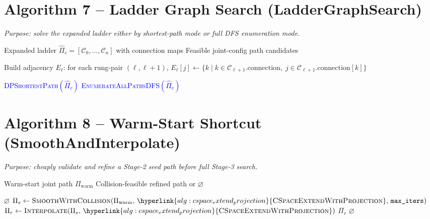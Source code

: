 \documentclass[11pt]{article}
\newcommand{\chg}[1]{\textcolor{blue}{#1}}
\newcommand{\AlgTarget}[1]{\hypertarget{#1}{}}
\newcommand{\AlgLink}[2]{\hyperlink{#1}{#2}}
\begin{document}
\section*{Algorithm 7 -- Ladder Graph Search (LadderGraphSearch)}
\noindent\textit{Purpose: solve the expanded ladder either by shortest-path mode or full DFS enumeration mode.}
\AlgTarget{alg:ladder_graph_search}
\begin{algorithm}[H]
\caption{\textsc{LadderGraphSearch}($\hat{\Pi}_c,\,\texttt{mode}$)}
\begin{algorithmic}[1]
\Require Expanded ladder $\hat{\Pi}_c = [\mathcal{C}_0, \ldots, \mathcal{C}_n]$ with connection maps
\Ensure  Feasible joint-config path candidates

\State Build adjacency $E_\ell$: for each rung-pair $(\ell, \ell{+}1)$,
       $E_\ell[j] \gets \{k \mid k \in \mathcal{C}_{\ell+1}.\text{connection},\; j \in \mathcal{C}_{\ell+1}.\text{connection}[k]\}$

\If{\chg{$\texttt{mode}=\texttt{shortest}$}}
  \State \chg{\Return \textsc{DPShortestPath}$(\hat{\Pi}_c)$}
\Else
  \State \chg{\Return \textsc{EnumerateAllPathsDFS}$(\hat{\Pi}_c)$}
\EndIf
\end{algorithmic}
\end{algorithm}

\section*{Algorithm 8 -- Warm-Start Shortcut (SmoothAndInterpolate)}
\noindent\textit{Purpose: cheaply validate and refine a Stage-2 seed path before full Stage-3 search.}
\AlgTarget{alg:smooth_and_interpolate}
\begin{algorithm}[H]
\caption{\textsc{SmoothAndInterpolate}($\Pi_{\text{warm}}$)}
\begin{algorithmic}[1]
\Require Warm-start joint path $\Pi_{\text{warm}}$
\Ensure  Collision-feasible refined path or $\varnothing$

  \State \Return $\varnothing$
\EndIf
\State \chg{$\Pi_s \gets \textsc{SmoothWithCollision}(\Pi_{\text{warm}},\,\AlgLink{alg:cspace_extend_projection}{\textsc{CSpaceExtendWithProjection}},\,\texttt{max\_iters})$}
\State \chg{$\Pi_r \gets \textsc{Interpolate}(\Pi_s,\,\AlgLink{alg:cspace_extend_projection}{\textsc{CSpaceExtendWithProjection}})$}
  \State \Return $\Pi_r$
\EndIf
\State \Return $\varnothing$
\end{algorithmic}
\end{algorithm}
\end{document}

